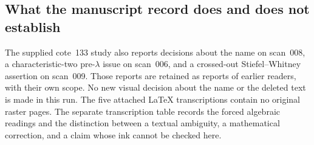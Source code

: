 \subsection{What the manuscript record does and does not establish}
The supplied cote~133 study also reports decisions about the name on scan~008, a characteristic-two pre-$\lambda$ issue on scan~006, and a crossed-out Stiefel--Whitney assertion on scan~009. Those reports are retained as reports of earlier readers, with their own scope. No new visual decision about the name or the deleted text is made in this run. The five attached LaTeX transcriptions contain no original raster pages. The separate transcription table records the forced algebraic readings and the distinction between a textual ambiguity, a mathematical correction, and a claim whose ink cannot be checked here.
